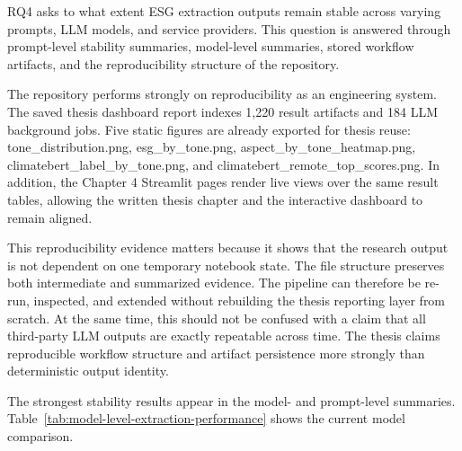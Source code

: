 \documentclass[english, online, cse, master]{dithesis}
\begin{document}
RQ4 asks to what extent ESG extraction outputs remain stable across varying prompts, LLM models, and service providers. This question is answered through prompt-level stability summaries, model-level summaries, stored workflow artifacts, and the reproducibility structure of the repository.

The repository performs strongly on reproducibility as an engineering system. The saved thesis dashboard report indexes 1,220 result artifacts and 184 LLM background jobs. Five static figures are already exported for thesis reuse: tone\_distribution.png, esg\_by\_tone.png, aspect\_by\_tone\_heatmap.png, climatebert\_label\_by\_tone.png, and climatebert\_remote\_top\_scores.png. In addition, the Chapter 4 Streamlit pages render live views over the same result tables, allowing the written thesis chapter and the interactive dashboard to remain aligned.

This reproducibility evidence matters because it shows that the research output is not dependent on one temporary notebook state. The file structure preserves both intermediate and summarized evidence. The pipeline can therefore be re-run, inspected, and extended without rebuilding the thesis reporting layer from scratch. At the same time, this should not be confused with a claim that all third-party LLM outputs are exactly repeatable across time. The thesis claims reproducible workflow structure and artifact persistence more strongly than deterministic output identity.

The strongest stability results appear in the model- and prompt-level summaries. Table~\ref{tab:model-level-extraction-performance} shows the current model comparison.
\end{document}
